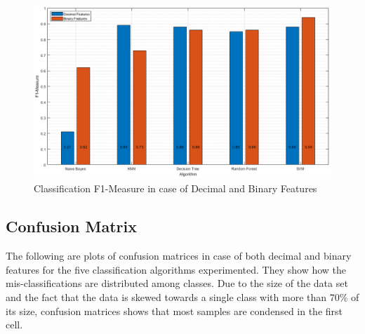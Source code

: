 \documentclass{article}
\begin{document}
\begin{figure}[H]
\centering
\includegraphics[width=\textwidth]{../Figures/f1.png}
\caption{Classification F1-Measure in case of Decimal and Binary Features}
\end{figure}

\subsection{Confusion Matrix}
The following are plots of confusion matrices in case of both decimal and binary features for the five classification algorithms experimented. They show how the mis-classifications are distributed among classes. Due to the size of the data set and the fact that the data is skewed towards a single class with more than 70\% of its size, confusion matrices shows that most samples are condensed in the first cell.


\end{document}
